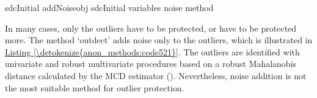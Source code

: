 \documentclass[letterpaper,10pt,english]{sphinxmanual}
\begin{document}
\def\sphinxLiteralBlockLabel{\label{\detokenize{anon_methods:code520}}}
%
\begin{sphinxVerbatim}[commandchars=\\\{\},numbers=left,firstnumber=1,stepnumber=1]
sdcInitial  addNoiseobj  sdcInitial
                       variables    
                                       
                                       
                                       
                       noise   method  
\end{sphinxVerbatim}

In many cases, only the outliers have to be protected, or have to be
protected more. The method ‘outdect’ adds noise only to the outliers,
which is illustrated in \hyperref[\detokenize{anon_methods:code521}]{Listing \ref{\detokenize{anon_methods:code521}}}. The outliers are identified with
univariate and robust multivariate procedures based on a robust
Mahalanobis distance calculated by the MCD estimator ({\hyperref[\detokenize{anon_methods:tmkc14}]{}}).
Nevertheless, noise addition is not the most suitable method for
outlier protection.
\end{document}
